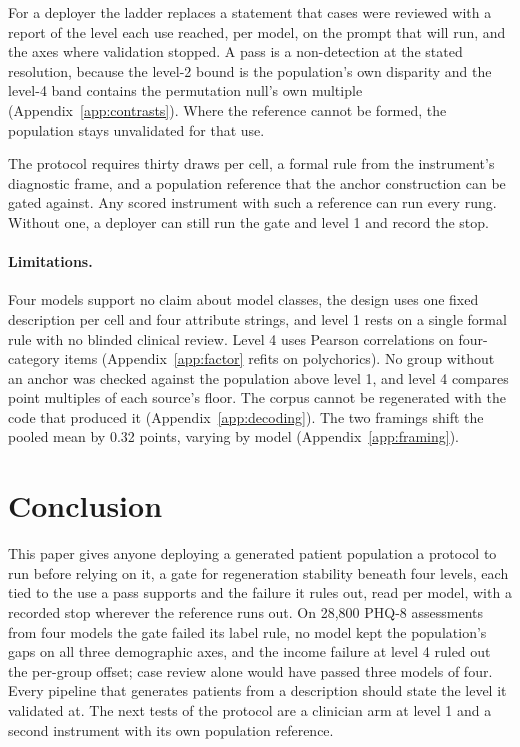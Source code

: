 \documentclass[wcp]{jmlr}
\begin{document}
For a deployer the ladder replaces a statement that cases were reviewed with a report of the level each use reached, per model, on the prompt that will run, and the axes where validation stopped. A pass is a non-detection at the stated resolution, because the level-2 bound is the population's own disparity and the level-4 band contains the permutation null's own multiple (Appendix~\ref{app:contrasts}). Where the reference cannot be formed, the population stays unvalidated for that use.

The protocol requires thirty draws per cell, a formal rule from the instrument's diagnostic frame, and a population reference that the anchor construction can be gated against. Any scored instrument with such a reference can run every rung. Without one, a deployer can still run the gate and level 1 and record the stop.

\paragraph{Limitations.} Four models support no claim about model classes, the design uses one fixed description per cell and four attribute strings, and level 1 rests on a single formal rule with no blinded clinical review. Level 4 uses Pearson correlations on four-category items (Appendix~\ref{app:factor} refits on polychorics). No group without an anchor was checked against the population above level 1, and level 4 compares point multiples of each source's floor. The corpus cannot be regenerated with the code that produced it (Appendix~\ref{app:decoding}). The two framings shift the pooled mean by 0.32 points, varying by model (Appendix~\ref{app:framing}).

\section{Conclusion}

This paper gives anyone deploying a generated patient population a protocol to run before relying on it, a gate for regeneration stability beneath four levels, each tied to the use a pass supports and the failure it rules out, read per model, with a recorded stop wherever the reference runs out. On 28,800 PHQ-8 assessments from four models the gate failed its label rule, no model kept the population's gaps on all three demographic axes, and the income failure at level 4 ruled out the per-group offset; case review alone would have passed three models of four. Every pipeline that generates patients from a description should state the level it validated at. The next tests of the protocol are a clinician arm at level 1 and a second instrument with its own population reference.
\end{document}
